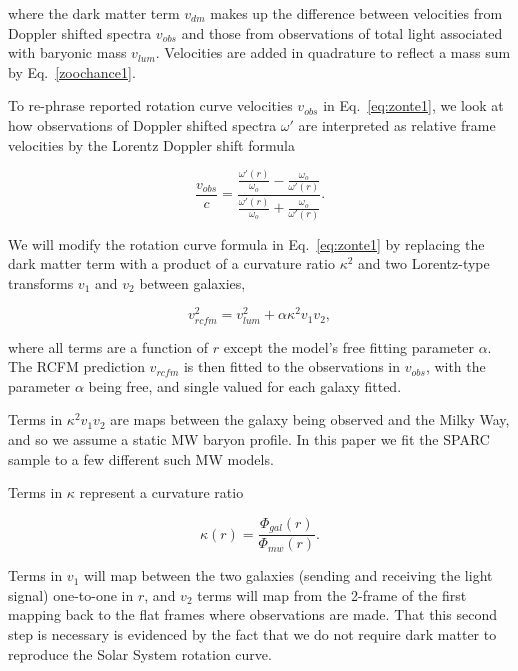 \documentclass[reprint,%
 amsmath,amssymb,
 aps,
]{revtex4-1}
\begin{document}
where  the dark matter term $v_{dm}$ makes up the difference between velocities from Doppler shifted spectra  $v_{obs}$ and those from observations of total light associated with baryonic mass $v_{lum}$. Velocities are added in quadrature to reflect a mass sum   by Eq.~\ref{zoochance1}.


 
To re-phrase reported rotation curve velocities $v_{obs}$ in Eq.~\ref{eq:zonte1}, we look at how 
observations of Doppler shifted spectra $\omega'$ are    interpreted   as  relative    frame velocities  by the  Lorentz   Doppler shift formula 
 
 \begin{equation}
 \frac{v_{obs}}{c}=
\frac{  \frac{\omega'(r)}{\omega_o} -  \frac{\omega_o}{\omega'(r)}  }{  \frac{\omega'(r)}{\omega_o}  +  \frac{\omega_o}{\omega'(r)} } . 
\label{eq:modelLumA}
\end{equation} 
 
We will modify
the rotation curve formula in Eq.~\ref{eq:zonte1} by replacing the dark matter term with a product  of a curvature ratio $\kappa^2$ and two Lorentz-type transforms     $v_1$ and $v_2$ between galaxies,   

\begin{equation}
v_{rcfm}^2 =  v_{lum}^2+\alpha \kappa^2 v_{1}v_{2}, 
\label{eq:zonteLCM}
\end{equation}  

 where all terms   are a function of $r$ except the model's free fitting parameter $\alpha$. 
The  RCFM  prediction $v_{rcfm}$ is then fitted to the observations in $v_{obs}$,   with the     parameter $\alpha$ being free, and single valued for each galaxy    fitted. 

Terms in $ \kappa^2 v_{1}v_{2}$ are   maps between the galaxy being observed and the Milky Way, and so we   assume a static MW baryon profile. In this paper we fit the SPARC sample to  a few different such MW models. 



 Terms in $\kappa$ 
 represent a  
curvature ratio  

 \begin{equation}
\kappa(r)=\frac{\Phi_{gal}(r)}{\Phi_{mw}(r)}.  
\label{eq:kappa2}  
\end{equation}  
 
 
Terms in $v_1$   will  map between the two galaxies (sending and receiving the light signal) one-to-one in $r$, and $v_2$ terms will map from the 2-frame of the first mapping back to the flat frames where observations are made. That this second step is necessary is evidenced by the fact that we do not require dark matter to reproduce the Solar System rotation curve.  
\end{document}
